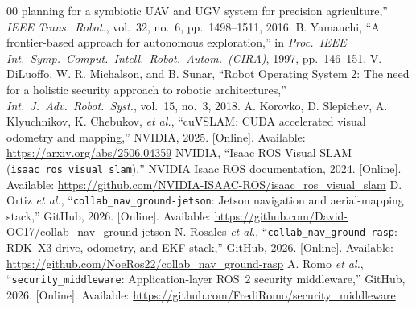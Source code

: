 \documentclass[conference]{IEEEtran}
\begin{document}
\begin{thebibliography}{00}
planning for a symbiotic UAV and UGV system for precision agriculture,'' \emph{IEEE
Trans.\ Robot.}, vol.~32, no.~6, pp.~1498--1511, 2016.
 B. Yamauchi, ``A frontier-based approach for autonomous
exploration,'' in \emph{Proc.\ IEEE Int.\ Symp.\ Comput.\ Intell.\ Robot.\
Autom.\ (CIRA)}, 1997, pp.~146--151.
 V. DiLuoffo, W. R. Michalson, and B. Sunar, ``Robot Operating
System 2: The need for a holistic security approach to robotic architectures,''
\emph{Int.\ J.\ Adv.\ Robot.\ Syst.}, vol.~15, no.~3, 2018.
 A. Korovko, D. Slepichev, A. Klyuchnikov, K. Chebukov, \emph{et al.},
``cuVSLAM: CUDA accelerated visual odometry and mapping,'' NVIDIA, 2025.
[Online]. Available: \url{https://arxiv.org/abs/2506.04359}
 NVIDIA, ``Isaac ROS Visual SLAM (\texttt{isaac\_ros\_visual\_slam}),''
NVIDIA Isaac ROS documentation, 2024. [Online]. Available:
\url{https://github.com/NVIDIA-ISAAC-ROS/isaac_ros_visual_slam}
 D. Ortiz \emph{et al.}, ``\texttt{collab\_nav\_ground-jetson}:
Jetson navigation and aerial-mapping stack,'' GitHub, 2026. [Online]. Available:
\url{https://github.com/David-OC17/collab_nav_ground-jetson}
 N. Rosales \emph{et al.}, ``\texttt{collab\_nav\_ground-rasp}:
RDK~X3 drive, odometry, and EKF stack,'' GitHub, 2026. [Online]. Available:
\url{https://github.com/NoeRos22/collab_nav_ground-rasp}
 A. Romo \emph{et al.}, ``\texttt{security\_middleware}:
Application-layer ROS~2 security middleware,'' GitHub, 2026. [Online]. Available:
\url{https://github.com/FrediRomo/security_middleware}
\end{thebibliography}
\end{document}

